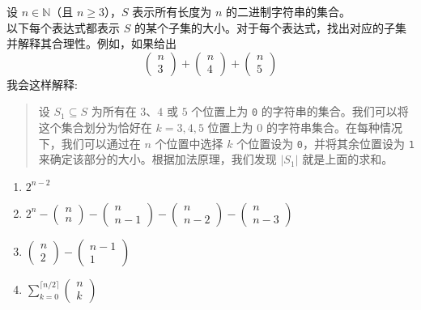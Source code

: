 \begin{exercise}
    设 $n \in \mathbb{N}$（且 $n \ge 3$），$S$ 表示所有长度为 $n$ 的二进制字符串的集合。\\
    以下每个表达式都表示 $S$ 的某个子集的大小。对于每个表达式，找出对应的子集并解释其合理性。例如，如果给出
    \[\begin{pmatrix}n\\3\end{pmatrix}+\begin{pmatrix}n\\4\end{pmatrix}+\begin{pmatrix}n\\5\end{pmatrix}\]
    我会这样解释:
    \begin{quote}
        设 $S_1 \subseteq S$ 为所有在 $3$、$4$ 或 $5$ 个位置上为 \verb|0| 的字符串的集合。我们可以将这个集合划分为恰好在 $k = 3,4,5$ 位置上为 $0$ 的字符串集合。在每种情况下，我们可以通过在 $n$ 个位置中选择 $k$ 个位置设为 \verb|0|，并将其余位置设为 \verb|1| 来确定该部分的大小。根据加法原理，我们发现 $|S_1|$ 就是上面的求和。
    \end{quote}
    \begin{enumerate}[label=(\alph*)]
        \item $2^{n-2}$
        \item $2^n-\begin{pmatrix}n\\n\end{pmatrix}-\begin{pmatrix}n\\n-1\end{pmatrix}-\begin{pmatrix}n\\n-2\end{pmatrix}-\begin{pmatrix}n\\n-3\end{pmatrix}$
        \item $\begin{pmatrix}n\\2\end{pmatrix}-\begin{pmatrix}n-1\\1\end{pmatrix}$
        \item $\displaystyle \sum_{k=0}^{\lceil n/2 \rceil} \begin{pmatrix}n\\k\end{pmatrix}$
    \end{enumerate}
\end{exercise}

